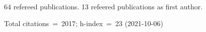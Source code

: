 64 refereed publications. 13 refeered publications as first author.

Total citations~=~2017; h-index~=~23 (2021-10-06)